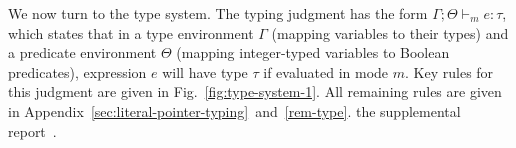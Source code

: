 
We now turn to the \lang type system.
%
The typing judgment has the form $\Gamma;\Theta\vdash_m e : \tau$,
which states that in a type environment $\Gamma$ (mapping variables to
their types) and a predicate environment $\Theta$ (mapping integer-typed
variables to Boolean predicates), expression $e$ will have type $\tau$ if evaluated
in mode $m$. Key rules for this judgment are given in
Fig.~\ref{fig:type-system-1}.
All remaining rules
are given in
\iftr
Appendix~\ref{sec:literal-pointer-typing}~and~\ref{rem-type}.
\else
the supplemental report~\cite{checkedc-tech-report}.
\fi

